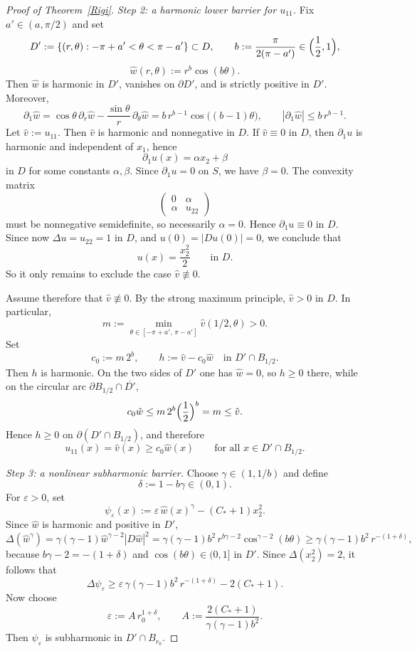 \documentclass[reqno,11pt]{amsart}
\numberwithin{equation}{section}
\theoremstyle{remark}
\begin{document}
\begin{proof}[Proof of Theorem~\ref{Rigi}]
\medskip
\noindent\textit{Step 2: a harmonic lower barrier for $u_{11}$.}
Fix $a'\in(a,\pi/2)$ and set
\[
D':=\{(r,\theta): -\pi+a'<\theta<\pi-a'\}\subset D,
\qquad
b:=\frac{\pi}{2(\pi-a')}\in\Bigl(\frac12,1\Bigr),
\]
\[
\hat w(r,\theta):=r^b\cos(b\theta).
\]
Then $\hat w$ is harmonic in $D'$, vanishes on $\partial D'$, and is strictly positive in $D'$.
Moreover,
\begin{equation}\label{eq:d1w}
\partial_1\hat w
=
\cos\theta\,\partial_r\hat w-\frac{\sin\theta}{r}\,\partial_\theta\hat w
=
b\,r^{b-1}\cos\bigl((b-1)\theta\bigr),
\qquad
|\partial_1\hat w|\le b\,r^{b-1}.
\end{equation}
Let
$\hat v:=u_{11}.$
Then $\hat v$ is harmonic and nonnegative in $D$.
If $\hat v\equiv0$ in $D$, then $\partial_1u$ is harmonic and independent of $x_1$, hence
\[
\partial_1u(x)=\alpha x_2+\beta
\]
in $D$ for some constants $\alpha,\beta$.
Since $\partial_1u=0$ on $S$, we have $\beta=0$.
The convexity matrix
\[
\begin{pmatrix}
0 & \alpha\\
\alpha & u_{22}
\end{pmatrix}
\]
must be nonnegative semidefinite, so necessarily $\alpha=0$.
Hence $\partial_1u\equiv0$ in $D$.
Since now $\Delta u=u_{22}=1$ in $D$, and $u(0)=|D u(0)|=0$, we conclude that
\[
u(x)=\frac{x_2^2}{2}
\qquad\text{in }D.
\]
So it only remains to exclude the case $\hat v\not\equiv0$.

Assume therefore that $\hat v\not\equiv0$.
By the strong maximum principle, $\hat v>0$ in $D$.
In particular,
\[
m:=\min_{\theta\in[-\pi+a',\,\pi-a']}\hat v(1/2,\theta)>0.
\]
Set
\[
c_0:=m\,2^b,
\qquad
h:=\hat v-c_0\hat w
\quad\text{in }D'\cap B_{1/2}.
\]
Then $h$ is harmonic. On the two sides of $D'$ one has $\hat w=0$, so $h\ge0$ there, while
on the circular arc $\partial B_{1/2}\cap \overline{D'}$,
\[
c_0\hat w\le m\,2^b \Bigl(\frac12\Bigr)^b=m\le \hat v.
\]
Hence $h\ge0$ on $\partial(D'\cap B_{1/2})$, and therefore
\begin{equation}\label{eq:v-lower}
u_{11}(x)=\hat v(x)\ge c_0\hat w(x)
\qquad\text{for all }x\in D'\cap B_{1/2}.
\end{equation}

\medskip
\noindent\textit{Step 3: a nonlinear subharmonic barrier.}
Choose $\gamma\in(1,1/b)$ and define
\[
\delta:=1-b\gamma\in(0,1).
\]
For $\varepsilon>0$, set
\[
\psi_\varepsilon(x):=\varepsilon\,\hat w(x)^\gamma-(C_\ast+1)x_2^2.
\]
Since $\hat w$ is harmonic and positive in $D'$,
\[
\Delta(\hat w^\gamma)
=
\gamma(\gamma-1)\hat w^{\gamma-2}|D \hat w|^2
=
\gamma(\gamma-1)b^2\,r^{b\gamma-2}\cos^{\gamma-2}(b\theta)
\ge \gamma(\gamma-1)b^2\,r^{-(1+\delta)},
\]
because $b\gamma-2=-(1+\delta)$ and $\cos(b\theta)\in(0,1]$ in $D'$.
Since $\Delta(x_2^2)=2$, it follows that
\[
\Delta\psi_\varepsilon
\ge
\varepsilon\,\gamma(\gamma-1)b^2\,r^{-(1+\delta)}-2(C_\ast+1).
\]
Now choose
\begin{equation}\label{eq:r0eps}
\varepsilon:=A\,r_0^{1+\delta},
\qquad
A:=\frac{2(C_\ast+1)}{\gamma(\gamma-1)b^2}.
\end{equation}
Then $\psi_\varepsilon$ is subharmonic in $D'\cap B_{r_0}$.


\end{proof}
\end{document}
